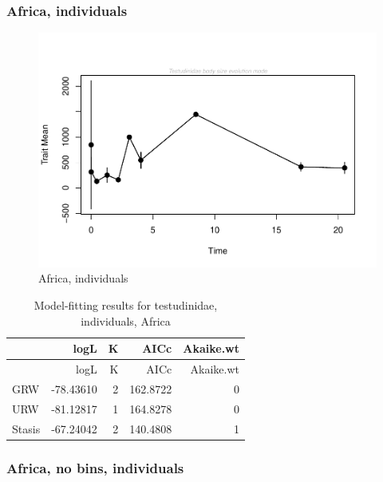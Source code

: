 \documentclass[]{article}
\begin{document}
\subsubsection{Africa, individuals}\label{africa-individuals}

\begin{figure}[htbp]
\centering
\includegraphics{MA_JJ_files/figure-latex/paleoTS, individuals, Africa-1.pdf}
\caption{Africa, individuals}
\end{figure}

\begin{longtable}[]{@{}lrrrr@{}}
\caption{Model-fitting results for testudinidae, individuals,
Africa}\tabularnewline
\toprule
& logL & K & AICc & Akaike.wt\tabularnewline
\midrule
\endfirsthead
\toprule
& logL & K & AICc & Akaike.wt\tabularnewline
\midrule
\endhead
GRW & -78.43610 & 2 & 162.8722 & 0\tabularnewline
URW & -81.12817 & 1 & 164.8278 & 0\tabularnewline
Stasis & -67.24042 & 2 & 140.4808 & 1\tabularnewline
\bottomrule
\end{longtable}

\newpage 

\subsubsection{Africa, no bins,
individuals}\label{africa-no-bins-individuals}
\end{document}
